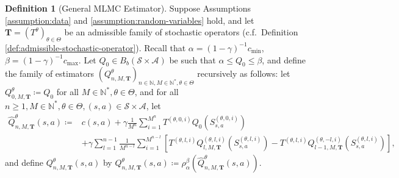 \documentclass[11pt]{article}
\numberwithin{equation}{section}
\theoremstyle{definition}
\newtheorem{definition}{Definition}[section]
\theoremstyle{remark}
\def\cA{\mathcal{A}}
\def\cS{\mathcal{S}}
\def\N{{\mathbb{N}}}
\begin{document}
\begin{definition}[General MLMC Estimator]
    \label{def:general-MLMC-estimator}
    Suppose Assumptions \ref{assumption:data} and \ref{assumption:random-variables} hold,
    and let 
       $\mathbf T = (T^{\theta})_{\theta \in \Theta}$ be an admissible family of stochastic operators (c.f.~Definition \ref{def:admissible-stochastic-operator}).
       Recall that $\alpha = (1-\gamma)^{-1} c_{\min}$,
       $\beta = (1 - \gamma)^{-1} c_{\max}$.  
    Let $Q_0 \in B_b(\mathcal S \times \mathcal A)$ be such that $ \alpha \leq Q_0 \leq \beta$, 
    and define the family of estimators 
    $({Q}_{n,M,\mathbf T}^{\theta})_{n\in \N,M\in \N^*,\theta\in \Theta}$ recursively as follows:
    let $Q ^{\theta}_{0,M, \mathbf T} \coloneqq  Q_0$
    for all $M\in \N^*,\theta\in \Theta$,
    and 
    for all $n\ge 1, M\in \N^*, \theta\in \Theta, (s,a) \in \cS \times \cA$, let
\begin{equation}
        \label{eq:MLMC-estimator-approx-T}
        \begin{aligned}
            \hat{Q}^\theta_{n,M, \mathbf T} (s,a) \coloneqq  & c(s,a) + \gamma  \frac{1}{M^n} \sum_{i = 1}^{M^n} T^{(\theta, 0, i)}Q_{0}\left(S^{(\theta, 0, i)}_{s,a}\right) \\
            & + \gamma \sum_{l = 1}^{n - 1}
            \frac{1}{M^{n-l}}
            \sum_{i = 1}^{M^{n - l}}\left[ T^{(\theta,l,i)}Q_{ l, M, \mathbf T}^{(\theta, l, i)}\left( S^{(\theta, l, i)}_{s,a}\right) - T^{(\theta,l,i)} Q_{l - 1,M, \mathbf T}^{(\theta, -l, i)}\left(S^{(\theta, l, i)}_{s,a}\right) \right],
        \end{aligned}
    \end{equation}
and define $ {Q}^\theta_{n,M, \mathbf T}(s,a) $ by
$
        Q ^{\theta}_{n,M, \mathbf T}(s,a)  \coloneqq \rho_{\alpha} ^{\beta} \left( \hat{Q} ^{\theta}_{n,M, \mathbf T}(s,a) \right).
$
\end{definition}
\end{document}
